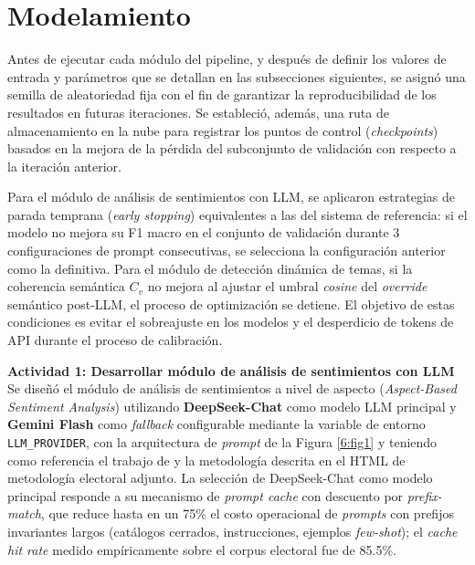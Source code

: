 \documentclass[listof=nochaptergap,12pt,times,authoryear]{report}
\let\cite\textcite
\begin{document}
\section{Modelamiento}

Antes de ejecutar cada módulo del pipeline, y después de definir los valores de
entrada y parámetros que se detallan en las subsecciones siguientes, se asignó una
semilla de aleatoriedad fija con el fin de garantizar la reproducibilidad de los
resultados en futuras iteraciones. Se estableció, además, una ruta de almacenamiento
en la nube para registrar los puntos de control (\textit{checkpoints}) basados en la
mejora de la pérdida del subconjunto de validación con respecto a la iteración
anterior.

Para el módulo de análisis de sentimientos con LLM, se aplicaron estrategias de
parada temprana (\textit{early stopping}) equivalentes a las del sistema de referencia:
si el modelo no mejora su F1 macro en el conjunto de validación durante 3 configuraciones
de prompt consecutivas, se selecciona la configuración anterior como la definitiva.
Para el módulo de detección dinámica de temas, si la coherencia semántica $C_v$ no
mejora al ajustar el umbral \textit{cosine} del \textit{override} semántico post-LLM,
el proceso de optimización se detiene. El objetivo
de estas condiciones es evitar el sobreajuste en los modelos y el desperdicio de tokens
de API durante el proceso de calibración.

\textbf{Actividad 1: Desarrollar módulo de análisis de sentimientos con LLM}
\\
Se diseñó el módulo de análisis de sentimientos a nivel de aspecto (\textit{Aspect-Based
Sentiment Analysis}) utilizando \textbf{DeepSeek-Chat} como modelo LLM principal y
\textbf{Gemini Flash} como \textit{fallback} configurable mediante la variable de
entorno \texttt{LLM\_PROVIDER}, con la arquitectura de \textit{prompt} de la
Figura \ref{6:fig1} y teniendo como referencia el trabajo de
\cite{pr_alvarez2023llm_political} y la metodología descrita en el HTML de
metodología electoral adjunto. La selección de DeepSeek-Chat como modelo principal
responde a su mecanismo de \textit{prompt cache} con descuento por
\textit{prefix-match}, que reduce hasta en un 75\% el costo operacional de
\textit{prompts} con prefijos invariantes largos (catálogos cerrados, instrucciones,
ejemplos \textit{few-shot}); el \textit{cache hit rate} medido empíricamente sobre
el corpus electoral fue de 85.5\%.
\end{document}
